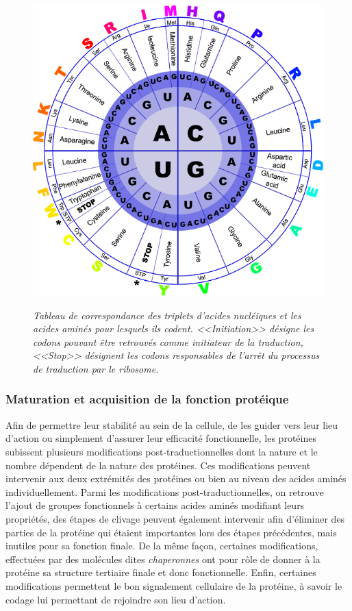 \begin{figure}
  \centering
  {\includegraphics[width=0.75\linewidth]{./figures/ch1/codon_table_circle}}
    \caption{\it Tableau de correspondance des triplets d'acides nucléiques et les acides aminés pour lesquels ils codent. <<Initiation>> désigne les codons pouvant être retrouvés comme initiateur de la traduction, <<Stop>> désignent les codons responsables de l'arrêt du processus de traduction par le ribosome.}
    \label{Fig:codon_table}
  \hspace{0.2cm}
\end{figure}

\subsubsection{Maturation et acquisition de la fonction protéique}

Afin de permettre leur stabilité au sein de la cellule, de les guider vers leur lieu d'action ou simplement d'assurer leur efficacité fonctionnelle, les protéines subissent plusieurs modifications post-traductionnelles dont la nature et le nombre dépendent de la nature des protéines. Ces modifications peuvent intervenir aux deux extrémités des protéines ou bien au niveau des acides aminés individuellement. Parmi les modifications post-traductionnelles, on retrouve l'ajout de groupes fonctionnels à certains acides aminés modifiant leurs propriétés, des étapes de clivage peuvent également intervenir afin d'éliminer des parties de la protéine qui étaient importantes lors des étapes précédentes, mais inutiles pour sa fonction finale. De la même façon, certaines modifications, effectuées par des molécules dites \textit{chaperonnes} ont pour rôle de donner à la protéine sa structure tertiaire finale et donc fonctionnelle. Enfin, certaines modifications permettent le bon signalement cellulaire de la protéine, à savoir le codage lui permettant de rejoindre son lieu d'action.

